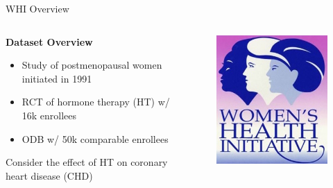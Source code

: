 \documentclass[usenames,dvipsnames]{beamer}
\theoremstyle{definition} %
\begin{document}
\begin{frame}{WHI Overview}
\begin{columns}
\begin{column}{0.48\textwidth}
\textbf{Dataset Overview}
\begin{itemize}
\item Study of postmenopausal women initiated in 1991 
\item RCT of hormone therapy (HT) w/ 16k enrollees
\item ODB w/ 50k comparable enrollees
\end{itemize}
\vspace{3mm}
Consider the effect of HT on coronary heart disease (CHD)
\end{column}
\begin{column}{0.48\textwidth}
\begin{figure}[width = 0.48\textwidth]
\includegraphics[width = \textwidth]{WHI_Logo}
\end{figure}
\end{column}
\end{columns} 
\end{frame}
\end{document}
